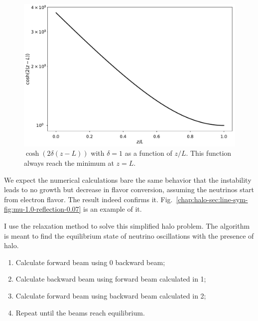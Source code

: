 \begin{figure}[!htbp]
    \centering
    \includegraphics[width=\textwidth]{chapters/assets/halo/cosh.pdf}
    \caption{ $\cosh(2\delta(z-L))$ with $\delta=1$ as a function of $z/L$. This function always reach the minimum at $z=L$.}
    \label{chap:halo-sec:line-sym-fig:cosh}
\end{figure}


We expect the numerical calculations bare the same behavior that the instability leads to no growth but decrease in flavor conversion, assuming the neutrinos start from electron flavor. The result indeed confirms it. Fig.~\ref{chap:halo-sec:line-sym-fig:mu-1.0-reflection-0.07} is an example of it.

I use the relaxation method to solve this simplified halo problem. The algorithm is meant to find the equilibrium state of neutrino oscillations with the presence of halo.
\begin{enumerate}
\item Calculate forward beam using 0 backward beam;
\item Calculate backward beam using forward beam calculated in 1;
\item Calculate forward beam using backward beam calculated in 2;
\item Repeat until the beams reach equilibrium.
\end{enumerate}


